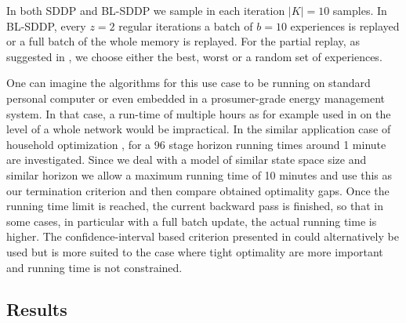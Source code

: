 \documentclass[a4paper,12pt]{article}
\begin{document}
In both SDDP and BL-SDDP we sample in each iteration $|K| = 10$ samples. In BL-SDDP, every $z = 2$ regular iterations a batch of $b = 10$ experiences is replayed or a full batch of the whole memory is replayed. For the partial replay, as suggested in \cite{avila2023batch}, we choose either the best, worst or a random set of experiences.

One can imagine the algorithms for this use case to be running on standard personal computer or even embedded in a prosumer-grade energy management system. In that case, a run-time of multiple hours as for example used in \cite{avila2023batch} on the level of a whole network would be impractical. In the similar application case of household optimization \cite{pacaud2022optimization}, for a 96 stage horizon running times around 1 minute are investigated. Since we deal with a model of similar state space size and similar horizon we allow a maximum running time of 10 minutes and use this as our termination criterion and then compare obtained optimality gaps. Once the running time limit is reached, the current backward pass is finished, so that in some cases, in particular with a full batch update, the actual running time is higher.
The confidence-interval based criterion presented in \cite{pereira1991multi} could alternatively be used but is more suited to the case where tight optimality are more important and running time is not constrained.


\subsection{Results}
\end{document}
